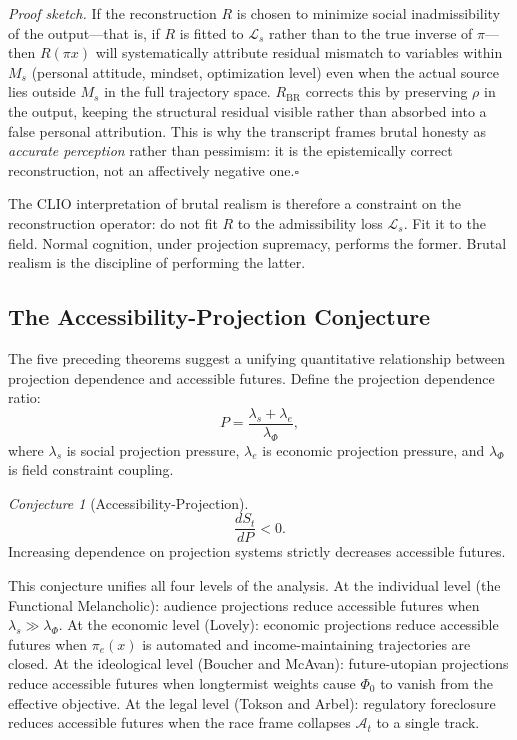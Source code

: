 \documentclass[12pt, a4paper]{article}
\theoremstyle{plain}
\theoremstyle{definition}
\theoremstyle{remark}
\newtheorem{conjecture}{Conjecture}
\begin{document}
\textit{Proof sketch.}
If the reconstruction $R$ is chosen to minimize social inadmissibility of the
output---that is, if $R$ is fitted to $\mathcal{L}_s$ rather than to the true
inverse of $\pi$---then $R(\pi x)$ will systematically attribute residual mismatch
to variables within $M_s$ (personal attitude, mindset, optimization level) even
when the actual source lies outside $M_s$ in the full trajectory space.
$R_{\mathrm{BR}}$ corrects this by preserving $\rho$ in the output, keeping the
structural residual visible rather than absorbed into a false personal attribution.
This is why the transcript frames brutal honesty as \textit{accurate perception}
rather than pessimism: it is the epistemically correct reconstruction, not an
affectively negative one.\hfill$\square$

The CLIO interpretation of brutal realism is therefore a constraint on the
reconstruction operator: do not fit $R$ to the admissibility loss $\mathcal{L}_s$.
Fit it to the field. Normal cognition, under projection supremacy, performs the former.
Brutal realism is the discipline of performing the latter.

\subsection{The Accessibility-Projection Conjecture}

The five preceding theorems suggest a unifying quantitative relationship between
projection dependence and accessible futures.
Define the projection dependence ratio:
\[
P = \frac{\lambda_s + \lambda_e}{\lambda_\Phi},
\]
where $\lambda_s$ is social projection pressure, $\lambda_e$ is economic projection
pressure, and $\lambda_\Phi$ is field constraint coupling.

\begin{conjecture}[Accessibility-Projection]
\[
\frac{dS_t}{dP} < 0.
\]
Increasing dependence on projection systems strictly decreases accessible futures.
\end{conjecture}

This conjecture unifies all four levels of the analysis.
At the individual level (the Functional Melancholic): audience projections reduce
accessible futures when $\lambda_s \gg \lambda_\Phi$.
At the economic level (Lovely): economic projections reduce accessible futures
when $\pi_e(x)$ is automated and income-maintaining trajectories are closed.
At the ideological level (Boucher and McAvan): future-utopian projections reduce
accessible futures when longtermist weights cause $\Phi_0$ to vanish from the
effective objective.
At the legal level (Tokson and Arbel): regulatory foreclosure reduces accessible
futures when the race frame collapses $\mathcal{A}_t$ to a single track.
\end{document}

